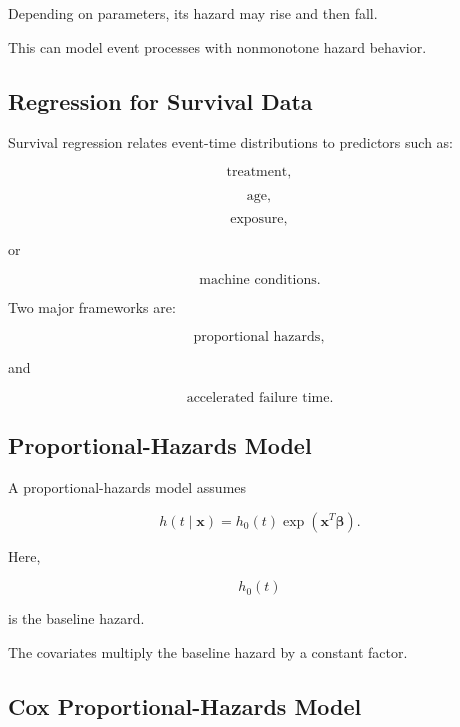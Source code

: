 Depending on parameters, its hazard may rise and then fall.

This can model event processes with nonmonotone hazard behavior.

\subsection{Regression for Survival Data}
\label{subsec:survival-regression}

Survival regression relates event-time distributions to predictors such
as:

\[
\boxed{
\text{treatment},
}
\]

\[
\boxed{
\text{age},
}
\]

\[
\boxed{
\text{exposure},
}
\]

or

\[
\boxed{
\text{machine conditions}.
}
\]

Two major frameworks are:

\[
\boxed{
\text{proportional hazards},
}
\]

and

\[
\boxed{
\text{accelerated failure time}.
}
\]

\subsection{Proportional-Hazards Model}
\label{subsec:proportional-hazards}

A proportional-hazards model assumes

\[
\boxed{
h
(
t\mid\mathbf{x}
)
=
h_0(t)
\exp
(
\mathbf{x}^T
\boldsymbol{\beta}
).
}
\]

Here,

\[
h_0(t)
\]

is the baseline hazard.

The covariates multiply the baseline hazard by a constant factor.

\subsection{Cox Proportional-Hazards Model}
\label{subsec:cox-proportional-hazards}

